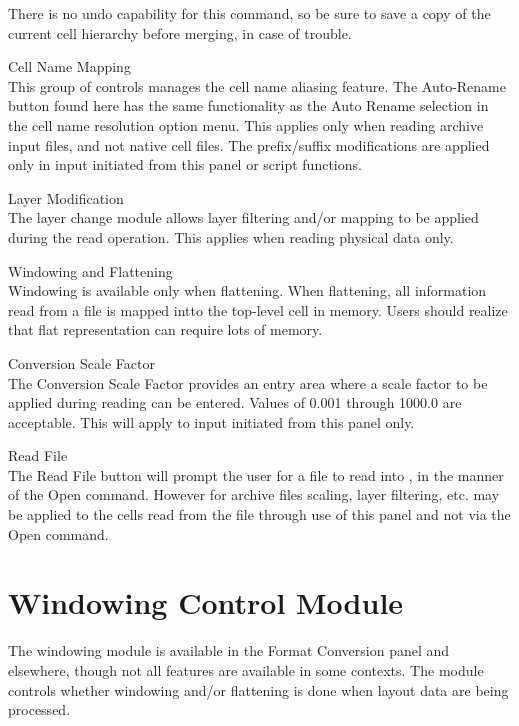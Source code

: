 \begin{description}
There is no undo capability for this command, so be sure to save a
copy of the current cell hierarchy before merging, in case of trouble.

\item{\cb Cell Name Mapping}\\
This group of controls manages the cell name aliasing feature.  The
{\cb Auto-Rename} button found here has the same functionality as the
{\cb Auto Rename} selection in the cell name resolution option menu. 
This applies only when reading archive input files, and not native
cell files.  The prefix/suffix modifications are applied only in input
initiated from this panel or script functions.

\item{\cb Layer Modification}\\
The layer change module allows layer filtering and/or mapping to be
applied during the read operation.  This applies when reading physical
data only.

\item{\cb Windowing and Flattening}\\
Windowing is available only when flattening.  When flattening, all
information read from a file is mapped intto the top-level cell in
memory.  Users should realize that flat representation can require
lots of memory.

\item{\cb Conversion Scale Factor}\\
The {\cb Conversion Scale Factor} provides an entry area where a scale
factor to be applied during reading can be entered.  Values of 0.001
through 1000.0 are acceptable.  This will apply to input initiated
from this panel only.

\item{\cb Read File}\\
The {\cb Read File} button will prompt the user for a file to read
into {\Xic}, in the manner of the {\cb Open} command.  However for
archive files scaling, layer filtering, etc.  may be applied to the
cells read from the file through use of this panel and not via the
{\cb Open} command.
\end{description}


\section{Windowing Control Module}
The windowing module is available in the {\cb Format Conversion} panel
and elsewhere, though not all features are available in some contexts. 
The module controls whether windowing and/or flattening is done when
layout data are being processed.

